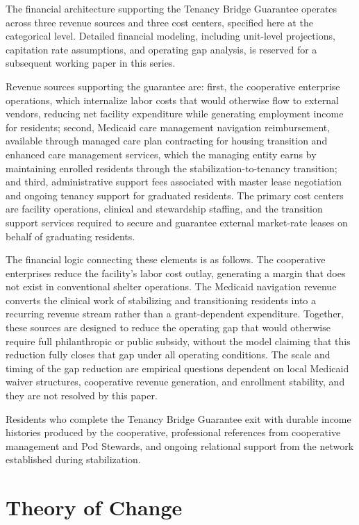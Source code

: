 \documentclass[12pt, letterpaper]{article}
\begin{document}
The financial architecture supporting the Tenancy Bridge Guarantee operates across three revenue sources and three cost centers, specified here at the categorical level. Detailed financial modeling, including unit-level projections, capitation rate assumptions, and operating gap analysis, is reserved for a subsequent working paper in this series.

Revenue sources supporting the guarantee are: first, the cooperative enterprise operations, which internalize labor costs that would otherwise flow to external vendors, reducing net facility expenditure while generating employment income for residents; second, Medicaid care management navigation reimbursement, available through managed care plan contracting for housing transition and enhanced care management services, which the managing entity earns by maintaining enrolled residents through the stabilization-to-tenancy transition; and third, administrative support fees associated with master lease negotiation and ongoing tenancy support for graduated residents. The primary cost centers are facility operations, clinical and stewardship staffing, and the transition support services required to secure and guarantee external market-rate leases on behalf of graduating residents.

The financial logic connecting these elements is as follows. The cooperative enterprises reduce the facility's labor cost outlay, generating a margin that does not exist in conventional shelter operations. The Medicaid navigation revenue converts the clinical work of stabilizing and transitioning residents into a recurring revenue stream rather than a grant-dependent expenditure. Together, these sources are designed to reduce the operating gap that would otherwise require full philanthropic or public subsidy, without the model claiming that this reduction fully closes that gap under all operating conditions. The scale and timing of the gap reduction are empirical questions dependent on local Medicaid waiver structures, cooperative revenue generation, and enrollment stability, and they are not resolved by this paper.

Residents who complete the Tenancy Bridge Guarantee exit with durable income histories produced by the cooperative, professional references from cooperative management and Pod Stewards, and ongoing relational support from the network established during stabilization.

\section{Theory of Change}
\end{document}

